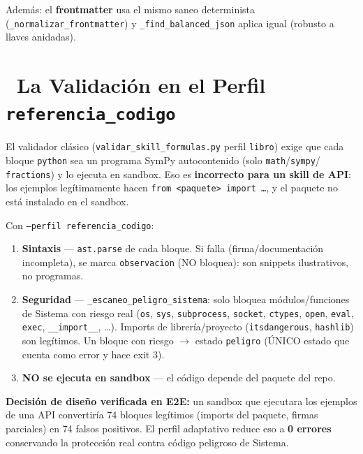 \documentclass[11pt,a4paper]{article}
\newcommand{\iconotexto}[2]{\textcolor{cyanNeon}{\faIcon{#1}}~#2}
\begin{document}
Además: el \textbf{frontmatter} usa el mismo saneo determinista (\texttt{\_normalizar\_frontmatter})
y \texttt{\_find\_balanced\_json} aplica igual (robusto a llaves anidadas).

\section{\iconotexto{shield-alt}{La Validación en el Perfil \texttt{referencia\_codigo}}}

El validador clásico (\texttt{validar\_skill\_formulas.py} perfil \texttt{libro}) exige que cada
bloque \texttt{python} sea un programa SymPy autocontenido (solo \texttt{math}/\texttt{sympy}/%
\texttt{fractions}) y lo ejecuta en sandbox. Eso es \textbf{incorrecto para un skill de API}:
los ejemplos legítimamente hacen \texttt{from <paquete> import \dots}, y el paquete no está
instalado en el sandbox.

Con \texttt{--perfil referencia\_codigo}:

\begin{enumerate}[leftmargin=*]
  \item \textbf{Sintaxis} --- \texttt{ast.parse} de cada bloque. Si falla (firma/documentación incompleta), se marca \texttt{observacion} (NO bloquea): son snippets ilustrativos, no programas.
  \item \textbf{Seguridad} --- \texttt{\_escaneo\_peligro\_sistema}: solo bloquea módulos/funciones de Sistema con riesgo real (\texttt{os}, \texttt{sys}, \texttt{subprocess}, \texttt{socket}, \texttt{ctypes}, \texttt{open}, \texttt{eval}, \texttt{exec}, \texttt{\_\_import\_\_}, \dots). Imports de librería/proyecto (\texttt{itsdangerous}, \texttt{hashlib}) son legítimos. Un bloque con riesgo $\to$ estado \texttt{peligro} (ÚNICO estado que cuenta como error y hace exit 3).
  \item \textbf{NO se ejecuta en sandbox} --- el código depende del paquete del repo.
\end{enumerate}

\begin{cajaAlerta}
\textbf{Decisión de diseño verificada en E2E:} un sandbox que ejecutara los ejemplos de una API
convertiría 74 bloques legítimos (imports del paquete, firmas parciales) en 74 falsos positivos.
El perfil adaptativo reduce eso a \textbf{0 errores} conservando la protección real contra código
peligroso de Sistema.
\end{cajaAlerta}
\end{document}

